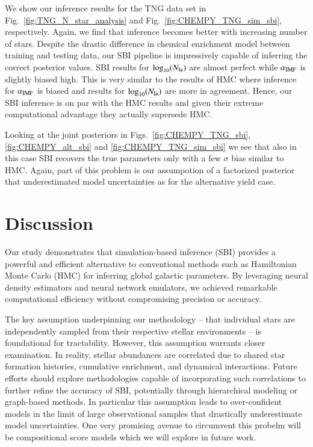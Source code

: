 \documentclass{aa}
\begin{document}
We show our inference results for the TNG data set in Fig.~\ref{fig:TNG_N_star_analysis} and Fig.~\ref{fig:CHEMPY_TNG_sim_sbi}, respectively.
Again, we find that inference becomes better with increasing number of stars. Despite the drastic difference in chemical enrichment model between training and testing data, our SBI pipeline is impressively capable of inferring the correct posterior values. SBI results for  $\log_{10}(N_{\rm Ia})$ are almost perfect while $\alpha_{\rm IMF}$ is slightly biased high. This is very similar to the results of HMC where inference for $\alpha_{\rm IMF}$ is biased and results for $\log_{10}(N_{\rm Ia})$ are more in agreement. Hence, our SBI inference is on par with the HMC results and given their extreme computational advantage they actually supersede HMC.

Looking at the joint posteriors in Figs.~\ref{fig:CHEMPY_TNG_sbi}, \ref{fig:CHEMPY_alt_sbi} and \ref{fig:CHEMPY_TNG_sim_sbi} we see that also in this case SBI recovers the true parameters only with a few $\sigma$ bias similar to HMC. Again, part of this problem is our assumpotion of a factorized posterior that underestimated model uncertainties as for the alternative yield case.



\section{Discussion}
\label{sec: discussion}


Our study demonstrates that simulation-based inference (SBI) provides a powerful and efficient alternative to conventional methods such as Hamiltonian Monte Carlo (HMC) for inferring global galactic parameters. By leveraging neural density estimators and neural network emulators, we achieved remarkable computational efficiency without compromising precision or accuracy.

The key assumption underpinning our methodology -- that individual stars are independently sampled from their respective stellar environments -- is foundational for tractability. However, this assumption warrants closer examination. In reality, stellar abundances are correlated due to shared star formation histories, cumulative enrichment, and dynamical interactions. Future efforts should explore methodologies capable of incorporating such correlations to further refine the accuracy of SBI, potentially through hierarchical modeling or graph-based methods. In particular this assumption leads to over-confident models in the limit of large observational samples that drastically underestimate model uncertainties. One very promising avenue to circumvent this probelm will be compositional score models \citep{compositional_score} which we will explore in future work.
\end{document}

